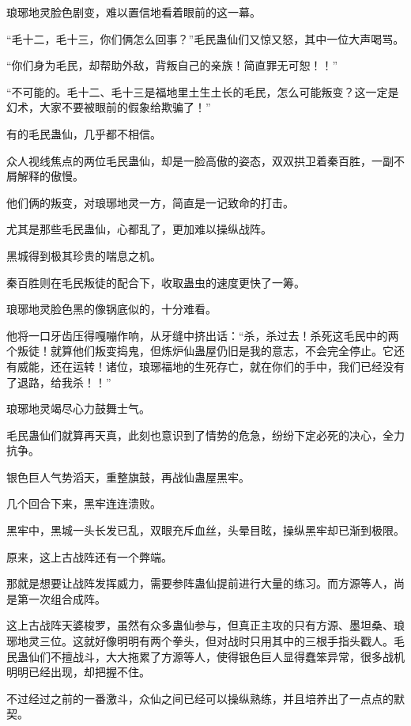
\begin{this_body}

琅琊地灵脸色剧变，难以置信地看着眼前的这一幕。

“毛十二，毛十三，你们俩怎么回事？”毛民蛊仙们又惊又怒，其中一位大声喝骂。

“你们身为毛民，却帮助外敌，背叛自己的亲族！简直罪无可恕！！”

“不可能的。毛十二、毛十三是福地里土生土长的毛民，怎么可能叛变？这一定是幻术，大家不要被眼前的假象给欺骗了！”

有的毛民蛊仙，几乎都不相信。

众人视线焦点的两位毛民蛊仙，却是一脸高傲的姿态，双双拱卫着秦百胜，一副不屑解释的傲慢。

他们俩的叛变，对琅琊地灵一方，简直是一记致命的打击。

尤其是那些毛民蛊仙，心都乱了，更加难以操纵战阵。

黑城得到极其珍贵的喘息之机。

秦百胜则在毛民叛徒的配合下，收取蛊虫的速度更快了一筹。

琅琊地灵脸色黑的像锅底似的，十分难看。

他将一口牙齿压得嘎嘣作响，从牙缝中挤出话：“杀，杀过去！杀死这毛民中的两个叛徒！就算他们叛变捣鬼，但炼炉仙蛊屋仍旧是我的意志，不会完全停止。它还有威能，还在运转！诸位，琅琊福地的生死存亡，就在你们的手中，我们已经没有了退路，给我杀！！”

琅琊地灵竭尽心力鼓舞士气。

毛民蛊仙们就算再天真，此刻也意识到了情势的危急，纷纷下定必死的决心，全力抗争。

银色巨人气势滔天，重整旗鼓，再战仙蛊屋黑牢。

几个回合下来，黑牢连连溃败。

黑牢中，黑城一头长发已乱，双眼充斥血丝，头晕目眩，操纵黑牢却已渐到极限。

原来，这上古战阵还有一个弊端。

那就是想要让战阵发挥威力，需要参阵蛊仙提前进行大量的练习。而方源等人，尚是第一次组合成阵。

这上古战阵天婆梭罗，虽然有众多蛊仙参与，但真正主攻的只有方源、墨坦桑、琅琊地灵三位。这就好像明明有两个拳头，但对战时只用其中的三根手指头戳人。毛民蛊仙们不擅战斗，大大拖累了方源等人，使得银色巨人显得蠢笨异常，很多战机明明已经出现，却把握不住。

不过经过之前的一番激斗，众仙之间已经可以操纵熟练，并且培养出了一点点的默契。


\end{this_body}
